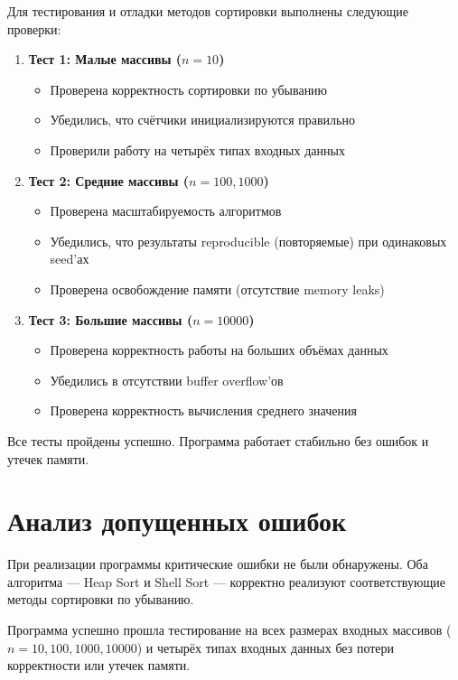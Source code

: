 \documentclass[a4paper,12pt,titlepage]{article}
\begin{document}
Для тестирования и отладки методов сортировки выполнены следующие проверки:

\begin{enumerate}
    \item \textbf{Тест 1: Малые массивы ($n = 10$)}
    \begin{itemize}
        \item Проверена корректность сортировки по убыванию
        \item Убедились, что счётчики инициализируются правильно
        \item Проверили работу на четырёх типах входных данных
    \end{itemize}
    
    \item \textbf{Тест 2: Средние массивы ($n = 100, 1000$)}
    \begin{itemize}
        \item Проверена масштабируемость алгоритмов
        \item Убедились, что результаты reproducible (повторяемые) при одинаковых seed'ах
        \item Проверена освобождение памяти (отсутствие memory leaks)
    \end{itemize}
    
    \item \textbf{Тест 3: Большие массивы ($n = 10000$)}
    \begin{itemize}
        \item Проверена корректность работы на больших объёмах данных
        \item Убедились в отсутствии buffer overflow'ов
        \item Проверена корректность вычисления среднего значения
    \end{itemize}
\end{enumerate}

Все тесты пройдены успешно. Программа работает стабильно без ошибок и утечек памяти.

\newpage

\section{Анализ допущенных ошибок}

При реализации программы критические ошибки не были обнаружены. Оба алгоритма — Heap Sort и Shell Sort — корректно реализуют соответствующие методы сортировки по убыванию. 

\bigskip
Программа успешно прошла тестирование на всех размерах входных массивов ($n = 10, 100, 1000, 10000$) и четырёх типах входных данных без потери корректности или утечек памяти.
\end{document}
